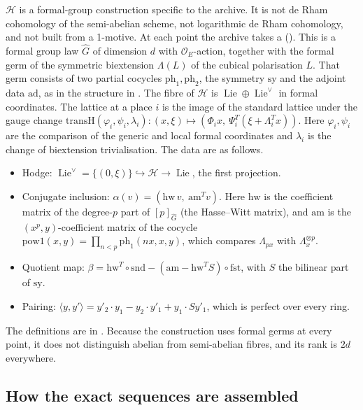 \documentclass[11pt]{article}
\theoremstyle{remark}
\begin{document}
$\mathcal H$ is a formal-group construction specific to the archive. It is not de Rham cohomology of the semi-abelian scheme, not logarithmic de Rham cohomology, and not built from a 1-motive. At each point the archive takes a  (). This is a formal group law $\hat G$ of dimension $d$ with $\mathcal O_E$-action, together with the formal germ of the symmetric biextension $\Lambda(L)$ of the cubical polarisation $L$. That germ consists of two partial cocycles $\mathrm{ph}_1,\mathrm{ph}_2$, the symmetry $\mathrm{sy}$ and the adjoint data $\mathrm{ad}$, as in the structure  in . The fibre of $\mathcal H$ is $\operatorname{Lie}\oplus\operatorname{Lie}^\vee$ in formal coordinates. The lattice at a place $i$ is the image of the standard lattice under the gauge change $\mathrm{transH}(\varphi_i,\psi_i,\lambda_i):(x,\xi)\mapsto(\Phi_ix,\ \Psi_i^{T}(\xi+\Lambda_i^{T}x))$. Here $\varphi_i,\psi_i$ are the comparison of the generic and local formal coordinates and $\lambda_i$ is the change of biextension trivialisation. The data are as follows.
\begin{itemize}[nosep]
\item Hodge: $\operatorname{Lie}^\vee=\{(0,\xi)\}\hookrightarrow\mathcal H\to\operatorname{Lie}$, the first projection.
\item Conjugate inclusion: $\alpha(v)=(\mathrm{hw}\,v,\ \mathrm{am}^{T}v)$. Here $\mathrm{hw}$ is the coefficient matrix of the degree-$p$ part of $[p]_{\hat G}$ (the Hasse--Witt matrix), and $\mathrm{am}$ is the $(x^p,y)$-coefficient matrix of the cocycle $\mathrm{pow1}(x,y)=\prod_{n<p}\mathrm{ph}_1(nx,x,y)$, which compares $\Lambda_{px}$ with $\Lambda_x^{\otimes p}$.
\item Quotient map: $\beta=\mathrm{hw}^{T}\circ\mathrm{snd}-(\mathrm{am}-\mathrm{hw}^{T}S)\circ\mathrm{fst}$, with $S$ the bilinear part of $\mathrm{sy}$.
\item Pairing: $\langle y,y'\rangle=y'_2\cdot y_1-y_2\cdot y'_1+y_1\cdot Sy'_1$, which is perfect over every ring.
\end{itemize}
The definitions are in . Because the construction uses formal germs at every point, it does not distinguish abelian from semi-abelian fibres, and its rank is $2d$ everywhere.

\subsection{How the exact sequences are assembled}
\end{document}
